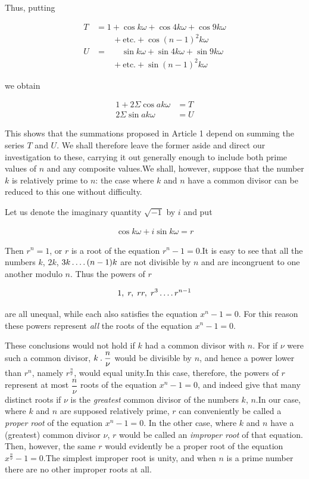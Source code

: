 Thus, putting

\[
\begin{aligned}
T&=1+\cos k\omega+\cos4k\omega+\cos9k\omega\\&\qquad+\text{etc.}+\cos(n-1)^2k\omega\\
U&=\phantom{1+}\sin k\omega+\sin4k\omega+\sin9k\omega\\&\qquad+\text{etc.}+\sin(n-1)^2k\omega
\end{aligned}
\]

we obtain

\[
\begin{aligned}
1+2\Sigma\cos ak\omega&=T\\
2\Sigma\sin ak\omega&=U
\end{aligned}
\]

This shows that the summations proposed in Article 1 depend on summing the series $T$ and $U$. We shall therefore leave the former aside and direct our investigation to these, carrying it out generally enough to include both prime values of $n$ and any composite values.\quad We shall, however, suppose that the number $k$ is relatively prime to $n$: the case where $k$ and $n$ have a common divisor can be reduced to this one without difficulty.


Let us denote the imaginary quantity $\surd{-1}$ by $i$ and put

\[
\begin{aligned}
\cos k\omega+i\sin k\omega=r
\end{aligned}
\]

Then $r^n=1$, or $r$ is a root of the equation $r^n-1=0$.\quad It is easy to see that all the numbers $k$, $2k$, $3k\mathinner{.\,.\,.\,.}(n-1)k$ are not divisible by $n$ and are incongruent to one another modulo $n$. Thus the powers of $r$

\[
\begin{aligned}
1,\;r,\;rr,\;r^3\mathinner{.\,.\,.\,.} r^{n-1}
\end{aligned}
\]

are all unequal, while each also satisfies the equation $x^n-1=0$. For this reason these powers represent \emph{all} the roots of the equation $x^n-1=0$.

These conclusions would not hold if $k$ had a common divisor with $n$. For if $\nu$ were such a common divisor, $k\mathbin{.}\dfrac n\nu$ would be divisible by $n$, and hence a power lower than $r^n$, namely $r^{\frac n\nu}$, would equal unity.\quad In this case, therefore, the powers of $r$ represent at most $\dfrac n\nu$ roots of the equation $x^n-1=0$, and indeed give that many distinct roots if $\nu$ is the \emph{greatest} common divisor of the numbers
$k$, $n$.\quad In our case, where $k$ and $n$ are supposed relatively prime, $r$ can conveniently be called a \emph{proper root} of the equation $x^n-1=0$. In the other case, where $k$ and $n$ have a (greatest) common divisor $\nu$, $r$ would be called an \emph{improper root} of that equation. Then, however, the same $r$ would evidently be a proper root of the equation $x^{\frac n\nu}-1=0$.\quad The simplest improper root is unity, and when $n$ is a prime number there are no other improper roots at all.

